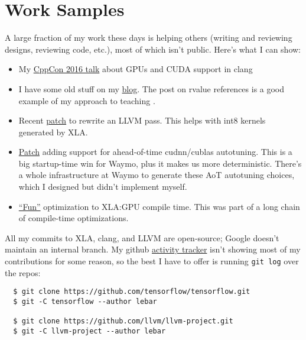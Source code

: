 \documentclass[12pt]{article}
\makeatletter
\DeclareRobustCommand{\Cpp}
{\valign{\vfil\hbox{##}\vfil\cr
   {C\kern-.05em}\cr
   $\hbox{\fontsize{\sf@size}{0}\textbf{+\kern-0.05em+}}$\cr}%
}
\makeatother
\begin{document}
\section*{Work Samples}

A large fraction of my work these days is helping others (writing and reviewing
designs, reviewing code, etc.), most of which isn't public.  Here's what I can
show:

\begin{itemize}
  \item My \href{https://youtu.be/KHa-OSrZPGo}{CppCon 2016 talk} about GPUs and
    CUDA support in clang
  \item I have some old stuff on my \href{https://jlebar.com}{blog}.  The post
    on rvalue references is a good example of my approach to teaching \Cpp.
  \item Recent \href{https://reviews.llvm.org/D149893}{patch} to rewrite an
    LLVM pass.  This helps with int8 kernels generated by XLA.
  \item
    \href{https://github.com/tensorflow/tensorflow/commit/9cfee581d2ce958d45f798d8a7be7f7e6dde1d41}{Patch}
    adding support for ahead-of-time cudnn/cublas autotuning.  This is a big
    startup-time win for Waymo, plus it makes us more deterministic.  There's a
    whole infrastructure at Waymo to generate these AoT autotuning choices,
    which I designed but didn't implement myself.
  \item
    \href{https://github.com/tensorflow/tensorflow/commit/852afbdcc087ba514ad285c658ff7b2a611d8e67}{``Fun''}
    optimization to XLA:GPU compile time.  This was part of a long chain of
    compile-time optimizations.
\end{itemize}

All my commits to XLA, clang, and LLVM are open-source; Google doesn't maintain
an internal branch.  My github \href{https://github.com/jlebar}{activity
tracker} isn't showing most of my contributions for some reason, so the best I
have to offer is running \texttt{git log} over the repos:
\begin{verbatim}
  $ git clone https://github.com/tensorflow/tensorflow.git
  $ git -C tensorflow --author lebar

  $ git clone https://github.com/llvm/llvm-project.git
  $ git -C llvm-project --author lebar
\end{verbatim}
\end{document}
